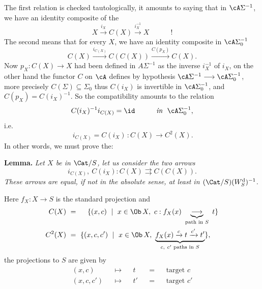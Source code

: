 The first relation is checked tautologically, it amounts to saying that in $\cA\Sigma^{-1}$, we have an identity composite of the
\[
X\xrightarrow{i_X}C(X)\xrightarrow{i_X^{-1}}X\qquad\quad!
\]
The second means that for every $X$, we have an identity composite in $\cA\Sigma_0^{-1}$
\[
C(X)\xrightarrow{i_{C(X)}}C(C(X))\xrightarrow{C(p_X)}C(X).
\]
Now $p_X:C(X)\longrightarrow X$ had been defined in $A\Sigma^{-1}$ as the inverse $i_X^{-1}$ of $i_X$, on the other hand the functor $C$ on $\cA$ defines by hypothesis $\cA\Sigma^{-1}\longrightarrow\cA\Sigma_0^{-1}$, more precisely $C(\Sigma)\subseteq\Sigma_0$ %
thus $C(i_X)$ is invertible in $\cA\Sigma_0^{-1}$, and $C(p_X)=C(i_X)^{-1}$. So the compatibility amounts to the relation
\[
C(i_X)^{-1}i_{C(X)}=\id\qquad\quad\textit{in}\ \ \cA\Sigma_0^{-1},
\]
i.e.
\[
\boxed{\,i_{C(X)}=C(i_X)\,}:C(X)\longrightarrow C^2(X).
\]
In other words, we must prove the: %

\textbf{Lemma.} \textit{Let $X$ be in $\Cat/S$, let us consider the two arrows}
\[
i_{C(X)},\ C(i_X):C(X)\rightrightarrows C(C(X)).
\]
\textit{These arrows are equal, if not in the absolute sense, at least in $(\Cat/S)(W_S^{\mathrm{d}})^{-1}$.}

Here $f_X:X\longrightarrow S$ is the standard projection and
\[
\begin{aligned}
C(X)\ &=\ \quad\{(x,c)\ \mid\ x\in\Ob\,X,\ c:f_X(x)\ \underbrace{\longrightarrow}_{\text{path in }S}\ t\}\\
C^2(X)\ &=\ \{(x,c,c')\ \mid\ x\in\Ob\,X,\ \underbrace{f_X(x)\xrightarrow{c}t\xrightarrow{c'}t'}_{c,\ c'\text{ paths in }S}\},
\end{aligned}
\]
the projections to $S$ are given by
\[
\begin{aligned}
(x,c)&&\longmapsto&&t&&=&&\text{target }c\\
(x,c,c')&&\longmapsto&&t'&&=&&\text{target }c'
\end{aligned}
\]

